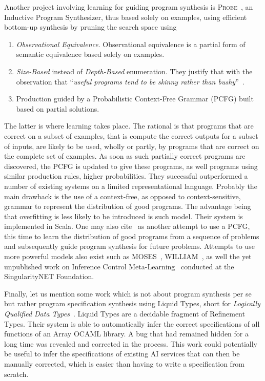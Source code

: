 \documentclass[]{report}
\begin{document}
Another project involving learning for guiding program synthesis is
\textsc{Probe}~\cite{Barke2020}, an Inductive Program Synthesizer,
thus based solely on examples, using efficient bottom-up synthesis by
pruning the search space using
\begin{enumerate}
\item \emph{Observational Equivalence}.  Observational equivalence is
  a partial form of semantic equivalence based solely on examples.
\item \emph{Size-Based} instead of \emph{Depth-Based} enumeration.
  They justify that with the observation that ``\emph{useful programs
    tend to be skinny rather than bushy}''~\cite{}.
\item Production guided by a Probabilistic Context-Free Grammar (PCFG)
  built based on partial solutions.
\end{enumerate}
The latter is where learning takes place.  The rational is that
programs that are correct on a subset of examples, that is compute the
correct outputs for a subset of inputs, are likely to be used, wholly
or partly, by programs that are correct on the complete set of
examples.  As soon as such partially correct programs are discovered,
the PCFG is updated to give these programs, as well programs using
similar production rules, higher probabilities.  They successful
outperformed a number of existing systems on a limited
representational language.  Probably the main drawback is the use of a
context-free, as opposed to context-sensitive, grammar to represent
the distribution of good programs.  The advantage being that
overfitting is less likely to be introduced is such model.  Their
system is implemented in Scala.  One may also cite~\cite{Ozkural2011}
as another attempt to use a PCFG, this time to learn the distribution
of good programs from a sequence of problems and subsequently guide
program synthesis for future problems.  Attempts to use more powerful
models also exist such as MOSES~\cite{Looks2006},
WILLIAM~\cite{Franz2022}, as well the yet unpublished work on
Inference Control Meta-Learning~\cite{Geisweiller2017,
  Geisweiller2018} conducted at the SingularityNET Foundation.

Finally, let us mention some work which is not about program synthesis
per se but rather program specification synthesis using Liquid Types,
short for \emph{Logically Qualified Data Types}~\cite{Rondon2008}.
Liquid Types are a decidable fragment of Refinement Types.  Their
system is able to automatically infer the correct specifications of
all functions of an Array OCAML library.  A bug that had remained
hidden for a long time was revealed and corrected in the process.
This work could potentially be useful to infer the specifications of
existing AI services that can then be manually corrected, which is
easier than having to write a specification from scratch.
\end{document}
